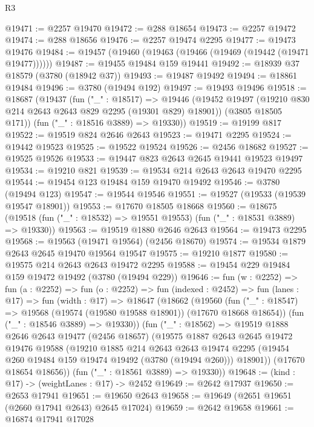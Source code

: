 \begin{lexlean}{R3}
\begin{coremodule}
@19471 := @2257 @19470
@19472 := @288 @18654
@19473 := @2257 @19472
@19474 := @288 @18656
@19476 := @2257 @19474 @2295
@19477 := @19473 @19476
@19484 := @19457 (@19460 (@19463 (@19466 (@19469 (@19442 (@19471 @19477))))))
@19487 := @19455 @19484 @159 @19441
@19492 := @18939 @37 @18579 (@3780 (@18942 @37))
@19493 := @19487 @19492
@19494 := @18861 @19484
@19496 := @3780 (@19494 @192)
@19497 := @19493 @19496
@19518 := @18687
    (@19437
      (fun ("_" : @18517) =>
      @19446
        (@19452 @19497 (@19210 @830 @214 @2643 @2643 @829 @2295 (@19301 @829) @18901))
        (@3805 @18505 @171))
      (fun ("_" : @18516 @3889) => @19330))
@19519 := @19199 @817
@19522 := @19519 @824 @2646 @2643
@19523 := @19471 @2295
@19524 := @19442 @19523
@19525 := @19522 @19524
@19526 := @2456 @18682
@19527 := @19525 @19526
@19533 := @19447 @823 @2643 @2645 @19441 @19523 @19497
@19534 := @19210 @821
@19539 := @19534 @214 @2643 @2643 @19470 @2295
@19544 := @19454 @123 @19484 @159 @19470 @19492
@19546 := @3780 (@19494 @123)
@19547 := @19544 @19546
@19551 := @19527 (@19533 (@19539 @19547 @18901))
@19553 := @17670 @18505 @18668
@19560 := @18675 (@19518 (fun ("_" : @18532) => @19551 @19553) (fun ("_" : @18531 @3889) => @19330))
@19563 := @19519 @1880 @2646 @2643
@19564 := @19473 @2295
@19568 := @19563 (@19471 @19564) (@2456 @18670)
@19574 := @19534 @1879 @2643 @2645 @19470 @19564 @19547
@19575 := @19210 @1877
@19580 := @19575 @214 @2643 @2643 @19472 @2295
@19588 := @19454 @229 @19484 @159 @19472 @19492 (@3780 (@19494 @229))
@19646 := fun (w : @2252) =>
  fun (a : @2252) =>
  fun (o : @2252) =>
  fun (indexed : @2452) =>
  fun (lanes : @17) =>
  fun (width : @17) =>
  @18647
    (@18662
      (@19560
        (fun ("_" : @18547) => @19568 (@19574 (@19580 @19588 @18901)) (@17670 @18668 @18654))
        (fun ("_" : @18546 @3889) => @19330))
      (fun ("_" : @18562) =>
      @19519
        @1888
        @2646
        @2643
        @19477
        (@2456 @18657)
        (@19575
          @1887
          @2643
          @2645
          @19472
          @19476
          @19588
          (@19210
            @1885
            @214
            @2643
            @2643
            @19474
            @2295
            (@19454 @260 @19484 @159 @19474 @19492 (@3780 (@19494 @260)))
            @18901))
        (@17670 @18654 @18656))
      (fun ("_" : @18561 @3889) => @19330))
@19648 := (kind : @17) -> (weightLanes : @17) -> @2452
@19649 := @2642 @17937
@19650 := @2653 @17941
@19651 := @19650 @2643
@19658 := @19649 (@2651 @19651 (@2660 @17941 @2643) @2645 @17024)
@19659 := @2642 @19658
@19661 := @16874 @17941 @17028

\end{coremodule}
\end{lexlean}
